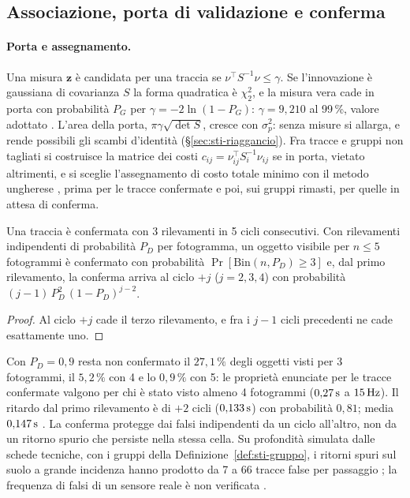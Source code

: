 \subsection{Associazione, porta di validazione e conferma}\label{sec:sti-porta}

\paragraph{Porta e assegnamento.} Una misura $\mathbf z$ è candidata per una traccia se $\nu^{\top}S^{-1}\nu\le\gamma$. Se l'innovazione è gaussiana di covarianza $S$ la forma quadratica è $\chi^2_2$, e la misura vera cade in porta con probabilità $P_G$ per $\gamma=-2\ln(1-P_G)$: $\gamma=9{,}210$ al 99\,\%, valore adottato . L'area della porta, $\pi\gamma\sqrt{\det S}$, cresce con $\sigma_p^2$: senza misure si allarga, e rende possibili gli scambi d'identità (\S\ref{sec:sti-riaggancio}). Fra tracce e gruppi non tagliati si costruisce la matrice dei costi $c_{ij}=\nu_{ij}^{\top}S_i^{-1}\nu_{ij}$ se in porta, vietato altrimenti, e si sceglie l'assegnamento di costo totale minimo con il metodo ungherese \cite{kuhn1955}, prima per le tracce confermate e poi, sui gruppi rimasti, per quelle in attesa di conferma.

\begin{proposizione}[Conferma]\label{prop:sti-conferma}
Una traccia è confermata con 3 rilevamenti in 5 cicli consecutivi. Con rilevamenti indipendenti di probabilità $P_D$ per fotogramma, un oggetto visibile per $n\le5$ fotogrammi è confermato con probabilità $\Pr[\mathrm{Bin}(n,P_D)\ge3]$ e, dal primo rilevamento, la conferma arriva al ciclo $+j$ ($j=2,3,4$) con probabilità $(j-1)\,P_D^2\,(1-P_D)^{j-2}$. 
\end{proposizione}
\begin{proof}
Al ciclo $+j$ cade il terzo rilevamento, e fra i $j-1$ cicli precedenti ne cade esattamente uno.
\end{proof}
Con $P_D=0{,}9$ resta non confermato il $27{,}1\,\%$ degli oggetti visti per 3 fotogrammi, il $5{,}2\,\%$ con 4 e lo $0{,}9\,\%$ con 5: le proprietà enunciate per le tracce confermate valgono per chi è stato visto almeno 4 fotogrammi ($0{,}27\,\mathrm{s}$ a $15\,\mathrm{Hz}$). Il ritardo dal primo rilevamento è di $+2$ cicli ($0{,}133\,\mathrm{s}$) con probabilità $0{,}81$; media $0{,}147\,\mathrm{s}$ . La conferma protegge dai falsi indipendenti da un ciclo all'altro, non da un ritorno spurio che persiste nella stessa cella. Su profondità simulata dalle schede tecniche, con i gruppi della Definizione~\ref{def:sti-gruppo}, i ritorni spuri sul suolo a grande incidenza hanno prodotto da 7 a 66 tracce false per passaggio ; la frequenza di falsi di un sensore reale è non verificata .

